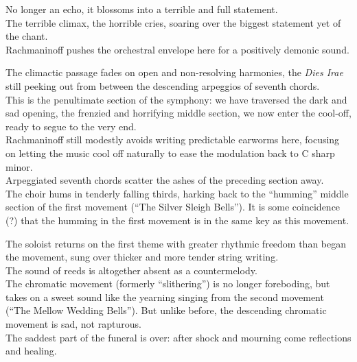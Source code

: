 \documentclass{beamer}
\begin{document}
\begin{frame}
  No longer an echo, it blossoms into a terrible and full statement. 
  \pause \\ 
  The terrible climax, the horrible cries, soaring over the biggest statement yet of the chant. 
  \pause \\ 
  Rachmaninoff pushes the orchestral envelope here for a positively demonic sound. 
\end{frame} 

\begin{frame}
  The climactic passage fades on open and non-resolving harmonies, the \textit{Dies Irae} still peeking out from between the descending arpeggios of seventh chords. 
  \pause \\ 
  This is the penultimate section of the symphony: we have traversed the dark and sad opening, the frenzied and horrifying middle section, we now enter the cool-off, ready to segue to the very end. 
  \pause \\ 
  Rachmaninoff still modestly avoids writing predictable earworms here, focusing on letting the music cool off naturally to ease the modulation back to C sharp minor. 
  \pause \\ 
  Arpeggiated seventh chords scatter the ashes of the preceding section away. 
  \pause \\
  The choir hums in tenderly falling thirds, harking back to the ``humming'' middle section of the first movement (``The Silver Sleigh Bells''). It is some coincidence (?) that the humming in the first movement is in the same key as this movement. 
\end{frame} 

\begin{frame} 
  The soloist returns on the first theme with greater rhythmic freedom than began the movement, sung over thicker and more tender string writing. 
  \pause \\ 
  The sound of reeds is altogether absent as a countermelody. 
  \pause \\ 
  The chromatic movement (formerly ``slithering'') is no longer foreboding, but takes on a sweet sound like the yearning singing from the second movement (``The Mellow Wedding Bells''). But unlike before, the descending chromatic movement is sad, not rapturous. 
  \pause \\ 
  The saddest part of the funeral is over: after shock and mourning come reflections and healing. 
\end{frame} 
\end{document}
